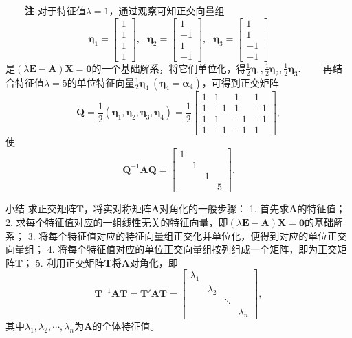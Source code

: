 \documentclass[compress,mathserif,cjk]{beamer}
\theoremstyle{remark}
\numberwithin{equation}{section}
\newcommand{\hei}{\bf}      %
\begin{document}
\begin{CJK}{UTF8}{gbsn}
\begin{frame}\small
\ \ \ \ {\hei 注} 对于特征值$\lambda=1$，通过观察可知正交向量组
$$\bm\eta_1=\left[\begin{matrix}1\\1\\1\\1\end{matrix}\right],~~~\bm\eta_2=\left[\begin{matrix}1\\-1\\1\\-1\end{matrix}\right],~~~
\bm\eta_3=\left[\begin{matrix}1\\1\\-1\\-1\end{matrix}\right]$$
是$(\lambda\bm E-\bm A)\bm X=\bm0$的一个基础解系，将它们单位化，得$\frac{1}2\bm\eta_1,\frac{1}2\bm\eta_2,\frac{1}2\bm\eta_3$.
\pause\vskip 5pt
\ \ \ \ 再结合特征值$\lambda=5$的单位特征向量$\frac{1}2\bm\eta_4~(\bm\eta_4=\bm\alpha_4)$，可得到正交矩阵
$$\bm Q=\frac{1}2(\bm\eta_1,\bm\eta_2,\bm\eta_3,\bm\eta_4)=\frac{1}{2}\left[\begin{matrix}1&1&1&1\\1&-1&1&-1\\1&1&-1&-1\\1&-1&-1&1\end{matrix}\right],$$
使
$$\bm Q^{-1}\bm{AQ}=\left[\begin{matrix}1&&&\\&1&&\\&&1&\\&&&5\end{matrix}\right].$$
\end{frame}

\begin{frame}{小结}\small
求正交矩阵$\bm T$，将实对称矩阵$\bm A$对角化的一般步骤：
\vskip5pt
1. 首先求$\bm A$的特征值；
\vskip5pt
2. 求每个特征值对应的一组线性无关的特征向量，即$(\lambda\bm E-\bm A)\bm X=\bm 0$的基础解系；
\vskip5pt
3. 将每个特征值对应的特征向量组正交化并单位化，便得到对应的单位正交向量组；
\vskip5pt
4. 将每个特征值对应的单位正交向量组按列组成一个矩阵，即为正交矩阵$\bm T$；
\vskip5pt
5. 利用正交矩阵$\bm T$将$\bm A$对角化，即
$$\bm T^{-1}\bm{AT}=\bm T'\bm{AT}=\left[\begin{matrix}\lambda_1&&&\\&\lambda_2&&\\&&\ddots&\\&&&\lambda_n\end{matrix}\right],$$
其中$\lambda_1,\lambda_2,\cdots,\lambda_n$为$\bm A$的全体特征值。


\end{frame}
\end{CJK}
\end{document}
